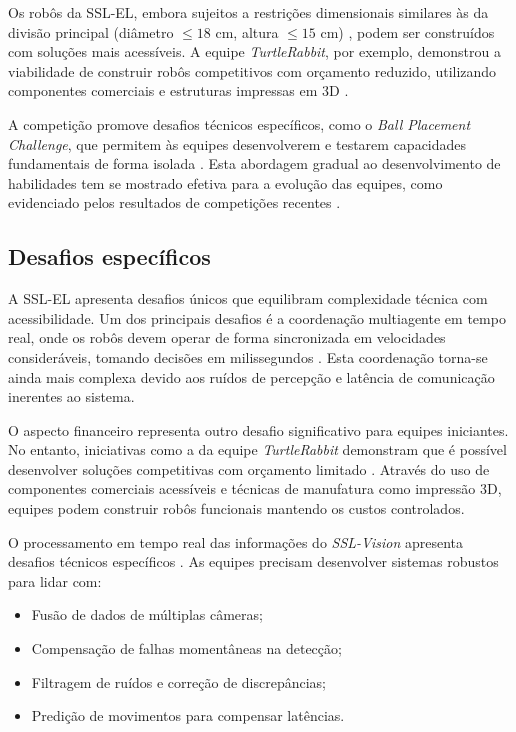 Os robôs da SSL-EL, embora sujeitos a restrições dimensionais similares às da divisão principal (diâmetro $\leq 18$ cm, altura $\leq 15$ cm) \cite{regras_ssl_el_2024}, podem ser construídos com soluções mais acessíveis. A equipe \textit{TurtleRabbit}, por exemplo, demonstrou a viabilidade de construir robôs competitivos com orçamento reduzido, utilizando componentes comerciais e estruturas impressas em 3D \cite{turtlerabbit_tdp_2024}.

A competição promove desafios técnicos específicos, como o \textit{Ball Placement Challenge}, que permitem às equipes desenvolverem e testarem capacidades fundamentais de forma isolada \cite{ssl_overview}. Esta abordagem gradual ao desenvolvimento de habilidades tem se mostrado efetiva para a evolução das equipes, como evidenciado pelos resultados de competições recentes \cite{ssl_overview}.

\subsection{Desafios específicos}
\label{subsec:futebol_desafios}

A SSL-EL apresenta desafios únicos que equilibram complexidade técnica com acessibilidade. Um dos principais desafios é a coordenação multiagente em tempo real, onde os robôs devem operar de forma sincronizada em velocidades consideráveis, tomando decisões em milissegundos \cite{regras_ssl_el_2024}. Esta coordenação torna-se ainda mais complexa devido aos ruídos de percepção e latência de comunicação inerentes ao sistema.

O aspecto financeiro representa outro desafio significativo para equipes iniciantes. No entanto, iniciativas como a da equipe \textit{TurtleRabbit} demonstram que é possível desenvolver soluções competitivas com orçamento limitado \cite{turtlerabbit_tdp_2024}. Através do uso de componentes comerciais acessíveis e técnicas de manufatura como impressão 3D, equipes podem construir robôs funcionais mantendo os custos controlados.

O processamento em tempo real das informações do \textit{SSL-Vision} apresenta desafios técnicos específicos \cite{ssl_overview}. As equipes precisam desenvolver sistemas robustos para lidar com:

\begin{itemize}
    \item Fusão de dados de múltiplas câmeras;
    \item Compensação de falhas momentâneas na detecção;
    \item Filtragem de ruídos e correção de discrepâncias;
    \item Predição de movimentos para compensar latências.
\end{itemize}


